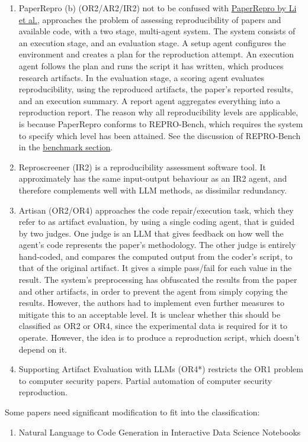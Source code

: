 \documentclass[8pt,a4paper]{article}
\begin{document}
\begin{enumerate}
    \item PaperRepro (b)\cite{paperrepro} (OR2/AR2/IR2)\label{itm:paperreprodesc}
        \subitem not to be confused with \hyperref[itm:li2026desc]{PaperRepro by Li et al.}\cite{li2026}, 
        approaches the problem of assessing reproducibility of papers and available code, with a two stage, multi-agent system.
        The system consists of an execution stage, and an evaluation stage.
        A setup agent configures the environment and creates a plan for the reproduction attempt.
        An execution agent follows the plan and runs the script it has written, which produces research artifacts.
        In the evaluation stage, a scoring agent evaluates reproducibility, using the reproduced artifacts, 
        the paper's reported results, and an execution summary. A report agent aggregates everything into a reproduction report.
        The reason why all reproducibility levels are applicable, is because PaperRepro\cite{paperrepro} conforms to REPRO-Bench\cite{reprobench}, 
        which requires the system to specify which level has been attained. See the discussion of REPRO-Bench
        in the \hyperref[itm:reprobenchatbenchmarks]{benchmark section}.
    \item Reproscreener\cite{reproscreener} (IR2)
        is a reproducibility assessment software tool.
        It approximately has the same input-output behaviour as
        an IR2 agent, and therefore complements well with LLM methods, as dissimilar redundancy.
    \item Artisan\cite{artisan} (OR2/OR4)
        \subitem approaches the code repair/execution task, which they refer to as artifact evaluation, 
        by using a single coding agent, that is guided by two judges.
        One judge is an LLM that gives feedback on how well the agent's code represents the paper's methodology.
        The other judge is entirely hand-coded, and compares the computed output from the coder's script, to that of the original artifact.
        It gives a simple pass/fail for each value in the result. 
        The system's preprocessing has obfuscated the results from the paper and other artifacts,
        in order to prevent the agent from simply copying the results.
        However, the authors had to implement even further measures to mitigate this to an acceptable level.
        It is unclear whether this should be classified as OR2 or OR4, since the experimental data is required for it to operate. 
        However, the idea is to produce a reproduction script, which doesn't depend on it.
    \item Supporting Artifact Evaluation with LLMs\cite{heye2025} (OR4*)
        \subitem restricts the OR1 problem to computer security papers. 
        \subitem Partial automation of computer security reproduction.
       
\end{enumerate}
Some papers need significant modification to fit into the classification:
\begin{enumerate}
    \item Natural Language to Code Generation in Interactive Data Science Notebooks\cite{yin2022} 
        \subitem 
\end{enumerate}
\end{document}
